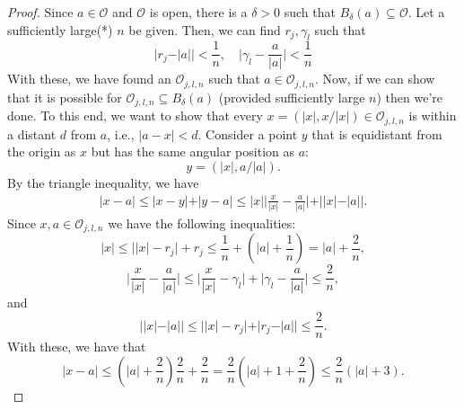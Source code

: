 \documentclass{article}
\theoremstyle{theorem}
\theoremstyle{remark}
\begin{document}
\begin{proof}
Since $a\in \mathcal{O}$ and $\mathcal{O}$ is open, there is a $\delta > 0$ such that $B_\delta(a) \subseteq \mathcal{O}$. Let a sufficiently large(*) $n$ be given. Then, we can find $r_j, \gamma_l$ such that 
\begin{equation*}
    \vert r_j - \vert a \vert\vert < \frac{1}{n}, \quad \bigg\vert \gamma_l - \frac{a}{\vert a\vert}\bigg\vert < \frac{1}{n} 
\end{equation*}
With these, we have found an $\mathcal{O}_{j,l,n}$ such that $a\in \mathcal{O}_{j,l,n}$. Now, if we can show that it is possible for $\mathcal{O}_{j,l,n} \subseteq B_\delta(a)$ (provided sufficiently large $n$) then we're done. To this end, we want to show that every $x = (\vert x \vert, x/\vert x \vert)\in \mathcal{O}_{j,l,n}$ is within a distant $d$ from $a$, i.e., $\vert a - x \vert < d$. Consider a point $y$ that is equidistant from the origin as $x$ but has the same angular position as $a$:
\begin{equation*}
    y = (\vert x \vert, a/\vert a\vert). 
\end{equation*}
By the triangle inequality, we have
\begin{eqnarray*}
    \vert x-a \vert \leq \vert x-y\vert + \vert y-a\vert \leq \vert x \vert \bigg\vert \frac{x}{\vert x \vert} - \frac{a}{\vert a \vert} \bigg\vert + \vert \vert x \vert - \vert a \vert \vert.
\end{eqnarray*}
Since $x,a\in \mathcal{O}_{j,l,n}$ we have the following inequalities:
\begin{equation*}
    \vert x \vert \leq \vert \vert x \vert- r_j \vert + r_j \leq \frac{1}{n} + \left(\vert a \vert + \frac{1}{n}\right) = \vert a \vert + \frac{2}{n},
\end{equation*}
\begin{equation*}
    \bigg\vert \frac{x}{\vert x \vert} - \frac{a}{\vert a \vert} \bigg\vert \leq \bigg\vert \frac{x}{\vert x \vert} - \gamma_l \bigg\vert + \bigg\vert \gamma_l - \frac{a}{\vert a \vert} \bigg\vert \leq \frac{2}{n},
\end{equation*}
and
\begin{equation*}
    \vert \vert x \vert - \vert a \vert \vert \leq \vert \vert x \vert - r_j \vert + \vert r_j -  \vert a \vert \vert \leq \frac{2}{n}.
\end{equation*}
With these, we have that
\begin{equation*}
    \vert x - a\vert \leq \left( \vert a \vert + \frac{2}{n} \right) \frac{2}{n}+ \frac{2}{n} = \frac{2}{n}\left( \vert a \vert + 1 + \frac{2}{n} \right) \leq \frac{2}{n}\left( \vert a \vert + 3 \right).

\end{equation*}
\end{proof}
\end{document}
